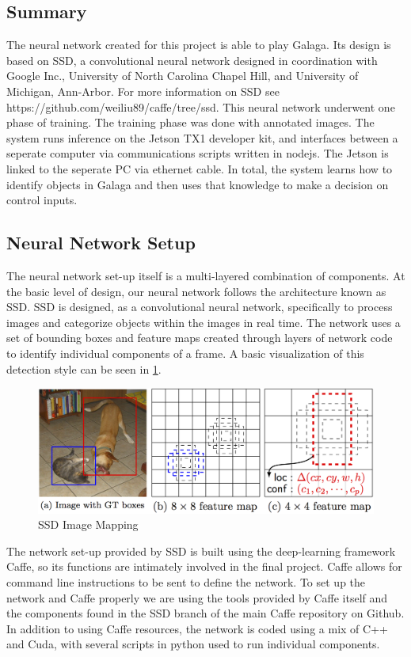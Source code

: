 \documentclass[onecolumn, draftclsnofoot,10pt, compsoc]{IEEEtran}
\begin{document}
\subsection{Summary}

The neural network created for this project is able to play Galaga.
Its design is based on SSD, a convolutional neural network designed in coordination with Google Inc.,  University of North Carolina Chapel Hill, and University of Michigan, Ann-Arbor.
For more information on SSD see https://github.com/weiliu89/caffe/tree/ssd.
This neural network underwent one phase of training.
The training phase was done with annotated images.
The system runs inference on the Jetson TX1 developer kit, and interfaces between a seperate computer via communications scripts written in nodejs.
The Jetson is linked to the seperate PC via ethernet cable.
In total, the system learns how to identify objects in Galaga and then uses that knowledge to make a decision on control inputs.

\subsection{Neural Network Setup}

The neural network set-up itself is a multi-layered combination of components.
At the basic level of design, our neural network follows the architecture known as SSD.
SSD is designed, as a convolutional neural network, specifically to process images and categorize objects within the images in real time.
The network uses a set of bounding boxes and feature maps created through layers of network code to identify individual components of a frame.
A basic visualization of this detection style can be seen in \ref{fig:1}.
\newline
\newline
\begin{figure}
  \includegraphics{SSDBoxes.eps}
  \caption{SSD Image Mapping}
  \label{fig:1}
\end{figure}The network set-up provided by SSD is built using the deep-learning framework Caffe, so its functions are intimately involved in the final project.
Caffe allows for command line instructions to be sent to define the network.
To set up the network and Caffe properly we are using the tools provided by Caffe itself and the components found in the SSD branch of the main Caffe repository on Github.
In addition to using Caffe resources, the network is coded using a mix of C++ and Cuda, with several scripts in python used to run individual components.
\end{document}
